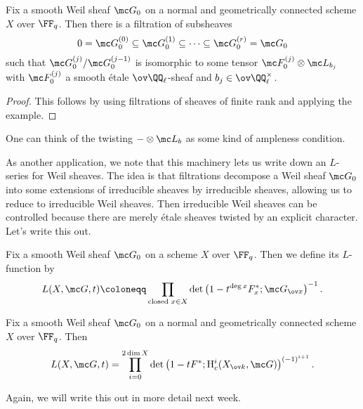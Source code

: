 \documentclass[../notes.tex]{subfiles}
\begin{document}
\begin{corollary}
	Fix a smooth Weil sheaf $\mc G_0$ on a normal and geometrically connected scheme $X$ over $\FF_q$. Then there is a filtration of subsheaves
	\[0=\mc G_{0}^{(0)}\subseteq\mc G_{0}^{(1)}\subseteq\cdots\subseteq\mc G_{0}^{(r)}=\mc G_0\]
	such that $\mc G_{0}^{(j)}/\mc G_{0}^{(j-1)}$ is isomorphic to some tensor $\mc F_0^{(j)}\otimes\mc L_{b_j}$ with $\mc F_0^{(j)}$ a smooth \'etale $\ov\QQ_\ell$-sheaf and $b_j\in\ov\QQ_\ell^\times$.
\end{corollary}
\begin{proof}
	This follows by using filtrations of sheaves of finite rank and applying the example.
\end{proof}
\begin{remark}
	One can think of the twisting $-\otimes\mc L_b$ as some kind of ampleness condition.
\end{remark}
As another application, we note that this machinery lets us write down an $L$-series for Weil sheaves. The idea is that filtrations decompose a Weil sheaf $\mc G_0$ into some extensions of irreducible sheaves by irreducible sheaves, allowing us to reduce to irreducible Weil sheaves. Then irreducible Weil sheaves can be controlled because there are merely \'etale sheaves twisted by an explicit character. Let's write this out.
\begin{notation}
	Fix a smooth Weil sheaf $\mc G_0$ on a scheme $X$ over $\FF_q$. Then we define its $L$-function by
	\[L(X,\mc G,t)\coloneqq\prod_{\text{closed }x\in X}\det\left(1-t^{\deg x}F_x^*;\mc G_{\ov x}\right)^{-1}.\]
\end{notation}
\begin{corollary}
	Fix a smooth Weil sheaf $\mc G_0$ on a normal and geometrically connected scheme $X$ over $\FF_q$. Then
	\[L(X,\mc G,t)=\prod_{i=0}^{2\dim X}\det\left(1-tF^*;\mathrm H^i_c(X_{\ov k},\mc G)\right)^{(-1)^{i+1}}.\]
\end{corollary}
Again, we will write this out in more detail next week.
\end{document}
